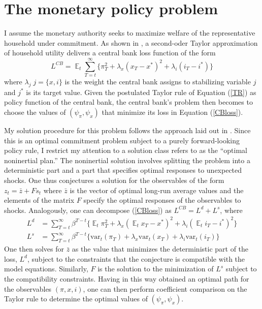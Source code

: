 \documentclass[11pt]{article}
\renewcommand{\[}{\begin{equation}}
\renewcommand{\]}{\end{equation}}
\DeclareMathOperator{\E}{\mathbb{E}}
\begin{document}
\section{The monetary policy problem}\label{monpol}
I assume the monetary authority seeks to maximize welfare of the representative household under commitment. As shown in \cite{woodford2011interest}, a second-oder Taylor approximation of household utility delivers a central bank loss function of the form
\begin{equation}
L^{CB} =\E_t \sum_{T=t}^{\infty}\{\pi_T^2 +\lambda_x(x_T - x^*)^2 +\lambda_i(i_T - i^*)\} \label{CBloss}
\end{equation}
where $\lambda_j \; j=\{x,i\}$ is the weight the central bank assigns to stabilizing variable $j$ and $j^*$ is its target value. Given the postulated Taylor rule of Equation (\ref{TR}) as policy function of the central bank, the central bank's problem then becomes to choose the values of $(\psi_{\pi}, \psi_x)$ that minimize its loss in Equation (\ref{CBloss}).

My solution procedure for this problem follows the approach laid out in \cite{woodford2011interest}. Since this is an optimal commitment problem subject to a purely forward-looking policy rule, I restrict my attention to a solution class \cite{woodford2011interest} refers to as the ``optimal noninertial plan.'' The noninertial solution involves splitting the problem into a deterministic part and a part that specifies optimal responses to unexpected shocks. One thus conjectures a solution for the observables of the form $z_t = \bar{z} + F s_t$ where $\bar{z}$ is the vector of optimal long-run average values and the elements of the matrix $F$ specify the optimal responses of the observables to shocks. Analogously, one can decompose (\ref{CBloss}) as $L^{CB}= L^{d} + L^{s}$, where
\begin{align}
L^{d} & = \sum_{T=t}^{\infty}\beta^{T-t}\{\E_t{\pi_T^2} +\lambda_x(\E_tx_T -x^*)^2 + \lambda_i(\E_ti_T -i^*)^2 \}\\
L^{s} & = \sum_{T=t}^{\infty}\beta^{T-t}\{\text{var}_t(\pi_T)+\lambda_x\text{var}_t(x_T) + \lambda_i\text{var}_t(i_T) \}
\end{align}
One then solves for $\bar{z}$ as the value that minimizes the deterministic part of the loss, $L^d$, subject to the constraints that the conjecture is compatible with the model equations. Similarly, $F$ is the solution to the minimization of $L^s$ subject to the compatibility constraints. Having in this way obtained an optimal path for the observables $(\pi,x,i)$, one can then perform coefficient comparison on the Taylor rule to determine the optimal values of $(\psi_{\pi}, \psi_x)$.
\end{document}
